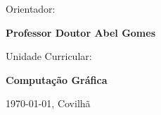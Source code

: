 \vspace{0.15cm}
\begin{center}
\begin{normalsize}
\begin{large}
Orientador:
\end{large}
\end{normalsize}
\end{center}

\vspace{0.05cm}
\begin{center}
\begin{large}
  \textbf{Professor Doutor Abel Gomes}
\end{large}
\end{center}

\vspace{0.15cm}
\begin{center}
\begin{normalsize}
\begin{large}
Unidade Curricular:
\end{large}
\end{normalsize}
\end{center}

\vspace{0.05cm}
\begin{center}
\begin{large}
\textbf{Computação Gráfica}
\end{large}
\end{center}

\vspace{0.05cm}
\begin{center}
\begin{normalsize}
\today, Covilhã
\end{normalsize}
\end{center}
